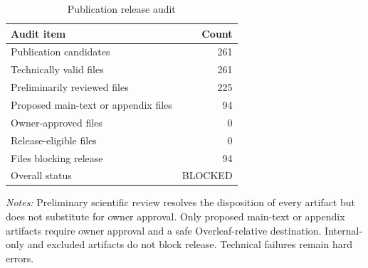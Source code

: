 \begin{table}[!htbp]
\centering\small
\caption{Publication release audit}
\label{tab:release_audit}
\begin{tabular}{lr}
\toprule
Audit item & Count \\
\midrule
Publication candidates & 261 \\
Technically valid files & 261 \\
Preliminarily reviewed files & 225 \\
Proposed main-text or appendix files & 94 \\
Owner-approved files & 0 \\
Release-eligible files & 0 \\
Files blocking release & 94 \\
\midrule
Overall status & BLOCKED \\
\bottomrule\end{tabular}
\parbox{0.97\linewidth}{\footnotesize \textit{Notes:} Preliminary scientific review resolves the disposition of every artifact but does not substitute for owner approval. Only proposed main-text or appendix artifacts require owner approval and a safe Overleaf-relative destination. Internal-only and excluded artifacts do not block release. Technical failures remain hard errors.}
\end{table}
